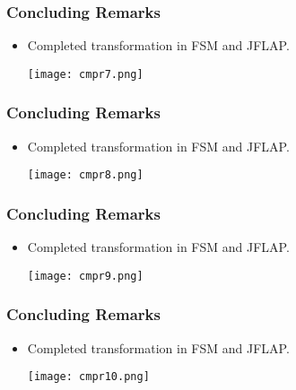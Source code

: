 \documentclass{beamer}
\begin{document}
\begin{frame}[fragile]
\frametitle{Concluding Remarks}
\begin{scriptsize}
\begin{itemize}

\item<1-> Completed transformation in FSM and JFLAP. \newline


\begin{center}
\texttt{[image: cmpr7.png]}
\end{center}


\end{itemize}
\end{scriptsize}
\end{frame}

\begin{frame}[fragile]
\frametitle{Concluding Remarks}
\begin{scriptsize}
\begin{itemize}

\item<1-> Completed transformation in FSM and JFLAP. \newline


\begin{center}
\texttt{[image: cmpr8.png]}
\end{center}


\end{itemize}
\end{scriptsize}
\end{frame}

\begin{frame}[fragile]
\frametitle{Concluding Remarks}
\begin{scriptsize}
\begin{itemize}

\item<1-> Completed transformation in FSM and JFLAP. \newline


\begin{center}
\texttt{[image: cmpr9.png]}
\end{center}


\end{itemize}
\end{scriptsize}
\end{frame}

\begin{frame}[fragile]
\frametitle{Concluding Remarks}
\begin{scriptsize}
\begin{itemize}

\item<1-> Completed transformation in FSM and JFLAP. \newline


\begin{center}
\texttt{[image: cmpr10.png]}
\end{center}


\end{itemize}
\end{scriptsize}
\end{frame}
\end{document}
